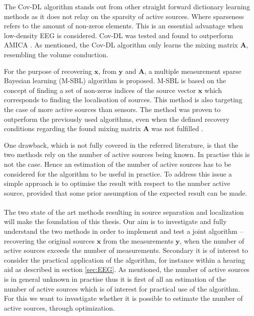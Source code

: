 The Cov-DL algorithm stands out from other straight forward dictionary learning methods as it does not relay on the sparsity of active sources. Where sparseness refers to the amount of non-zeros elements. This is an essential advantage when low-density EEG is considered. 
Cov-DL was tested and found to outperform AMICA \cite{Balkan2015}.  
As mentioned, the Cov-DL algorithm only learns the mixing matrix $\mathbf{A}$, resembling the volume conduction.

For the purpose of recovering $\mathbf{x}$, from $\mathbf{y}$ and $\mathbf{A}$, a multiple measurement sparse Bayesian learning (M-SBL) algorithm is proposed. M-SBL is based on the concept of finding a set of non-zeros indices of the source vector $\mathbf{x}$ which corresponds to finding the localisation of sources. This method is also targeting the case of more active sources than sensors.
The method was proven to outperform the previously used algorithms, even when the defined recovery conditions regarding the found mixing matrix $\mathbf{A}$ was not fulfilled \cite{Balkan2014}.

One drawback, which is not fully covered in the referred literature, is that the two methods rely on the number of active sources being known. 
In practise this is not the case. 
Hence an estimation of the number of active sources has to be considered for the algorithm to be useful in practice. To address this issue a simple approach is to optimise the result with respect to the number active source, provided that some prior assumption of the expected result can be made.      
\\ \\
The two state of the art methods resulting in source separation and localization will make the foundation of this thesis. 
Our aim is to investigate and fully understand the two methods in order to implement and test a joint algorithm -- recovering the original sources $\mathbf{x}$ from the measurements $\mathbf{y}$, when the number of active sources exceeds the number of measurements. 
Secondary it is of interest to consider the practical application of the algorithm, for instance within a hearing aid as described in section \ref{sec:EEG}.  
As mentioned, the number of active sources is in general unknown in practise thus it is first of all an estimation of the number of active sources which is of interest for practical use of the algorithm. 
For this we want to investigate whether it is possible to estimate the number of active sources, through optimization.   
 


 
